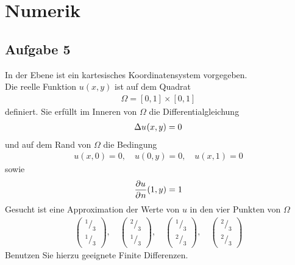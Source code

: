 \documentclass[
	final,
	a4paper,
	oneside,
	parskip=full,
	headings=standardclasses,
	headings=big,
	pointednumbers
]{scrartcl}
\newcommand{\f}[2]{\frac{#1}{#2}}
\newcommand{\kl}[1]{{\left( #1 \right)}}
\newcommand{\ks}[1]{{\left[ #1 \right]}}
\begin{document}
    \newpage
    
    \section*{Numerik}

    \subsection*{Aufgabe 5}
    In der Ebene ist ein kartesisches Koordinatensystem vorgegeben. \\
    Die reelle Funktion $u\kl{x,y}$ ist auf dem Quadrat
    \begin{align*}
        \Omega = \ks{0, 1} \times \ks{0, 1}
    \end{align*}
    definiert. Sie erfüllt im Inneren von $\Omega$ die Differentialgleichung
    \begin{align*}
        \du \kl{x,  y} = 0
    \end{align*}
    und auf dem Rand von $\Omega$ die Bedingung
    \begin{align*}
        u{\left(x,  0\right)} = 0, \quad
        u{\left(0,  y\right)} = 0, \quad
        u{\left(x,  1\right)} = 0
    \end{align*}
    sowie
    \begin{align*}
        \f{\pu}{\p n}\kl{1,  y} = 1
    \end{align*}
    Gesucht ist eine Approximation der Werte von $u$ in den vier Punkten von $\Omega$
    \begin{align*}
        \begin{pmatrix}
            {^1/_3} \\ {^1/_3}
        \end{pmatrix},\quad
        \begin{pmatrix}
            {^2/_3} \\ {^1/_3}
        \end{pmatrix},\quad
        \begin{pmatrix}
            {^1/_3} \\ {^2/_3}
        \end{pmatrix},\quad
        \begin{pmatrix}
            {^2/_3} \\ {^2/_3}
        \end{pmatrix}
    \end{align*}
    Benutzen Sie hierzu geeignete Finite Differenzen.
\end{document}
